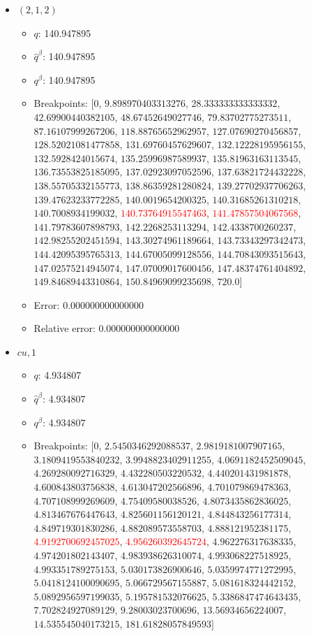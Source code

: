 \documentclass{article}%
\begin{document}
\begin{itemize}
\begin{itemize}
		\item Error: 0.000000000000000%
		\item Relative error: 0.000000000000000%
	\end{itemize}%
	\item $(2, 1, 2)$%
	\begin{itemize}%
		\item $q$: 140.947895%
		\item $\hat{q}^\beta$: 140.947895%
		\item $q^\beta$: 140.947895%
		\item Breakpoints: $[$$0$, $9.898970403313276$, $28.333333333333332$, $42.69900440382105$, $48.67452649027746$, $79.83702775273511$, $87.16107999267206$, $118.88765652962957$, $127.07690270456857$, $128.52021081477858$, $131.69760457629607$, $132.12228195956155$, $132.5928424015674$, $135.25996987589937$, $135.81963163113545$, $136.73553825185095$, $137.02923097052596$, $137.63821724432228$, $138.55705332155773$, $138.86359281280824$, $139.27702937706263$, $139.47623233772285$, $140.0019654200325$, $140.31685261310218$, $140.7008934199032$, \textcolor{red}{$140.73764915547463$}, \textcolor{red}{$141.47857504067568$}, $141.79783607898793$, $142.2268253113294$, $142.4338700260237$, $142.98255202451594$, $143.30274961189664$, $143.73343297342473$, $144.42095395765313$, $144.67005099128556$, $144.70843093515643$, $147.02575214945074$, $147.07009017600456$, $147.48374761404892$, $149.84689443310864$, $150.84969099235698$, $720.0$$]$%
		\item Error: 0.000000000000000%
		\item Relative error: 0.000000000000000%
	\end{itemize}%
	\item $\textit{cu},1$%
	\begin{itemize}%
		\item $q$: 4.934807%
		\item $\hat{q}^\beta$: 4.934807%
		\item $q^\beta$: 4.934807%
		\item Breakpoints: $[$$0$, $2.5450346292088537$, $2.9819181007907165$, $3.1809419553840232$, $3.9948823402911255$, $4.0691182452509045$, $4.269280092716329$, $4.432280503220532$, $4.440201431981878$, $4.600843803756838$, $4.613047202566896$, $4.701079869478363$, $4.707108999269609$, $4.75409580038526$, $4.8073435862836025$, $4.813467676447643$, $4.825601156120121$, $4.844843256177314$, $4.849719301830286$, $4.882089573558703$, $4.888121952381175$, \textcolor{red}{$4.9192700692457025$}, \textcolor{red}{$4.956260392645724$}, $4.962276317638335$, $4.974201802143407$, $4.983938626310074$, $4.993068227518925$, $4.993351789275153$, $5.030173826900646$, $5.0359974771272995$, $5.0418124100090695$, $5.066729567155887$, $5.081618324442152$, $5.0892956597199035$, $5.195781532076625$, $5.3386847474643435$, $7.702824927089129$, $9.28003023700696$, $13.56934656224007$, $14.535545040173215$, $181.61828057849593$$]$%

\end{itemize}
\end{itemize}
\end{document}

